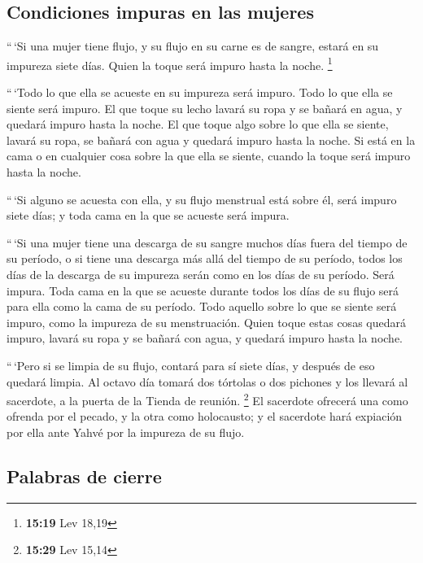 \begin{paracol}{2}
\hypertarget{condiciones-impuras-en-las-mujeres}{%
\subsection{Condiciones impuras en las
mujeres}\label{condiciones-impuras-en-las-mujeres}}

 ``\,`Si una mujer tiene flujo, y su flujo en su carne es
de sangre, estará en su impureza siete días. Quien la toque será impuro
hasta la noche. \footnote{\textbf{15:19} Lev 18,19}

 ``\,`Todo lo que ella se acueste en su impureza será
impuro. Todo lo que ella se siente será impuro.  El que
toque su lecho lavará su ropa y se bañará en agua, y quedará impuro
hasta la noche.  El que toque algo sobre lo que ella se
siente, lavará su ropa, se bañará con agua y quedará impuro hasta la
noche.  Si está en la cama o en cualquier cosa sobre la
que ella se siente, cuando la toque será impuro hasta la noche.

 ``\,`Si alguno se acuesta con ella, y su flujo menstrual
está sobre él, será impuro siete días; y toda cama en la que se acueste
será impura.

 ``\,`Si una mujer tiene una descarga de su sangre muchos
días fuera del tiempo de su período, o si tiene una descarga más allá
del tiempo de su período, todos los días de la descarga de su impureza
serán como en los días de su período. Será impura.  Toda
cama en la que se acueste durante todos los días de su flujo será para
ella como la cama de su período. Todo aquello sobre lo que se siente
será impuro, como la impureza de su menstruación.  Quien
toque estas cosas quedará impuro, lavará su ropa y se bañará con agua, y
quedará impuro hasta la noche.

 ``\,`Pero si se limpia de su flujo, contará para sí
siete días, y después de eso quedará limpia.  Al octavo
día tomará dos tórtolas o dos pichones y los llevará al sacerdote, a la
puerta de la Tienda de reunión. \footnote{\textbf{15:29} Lev 15,14}
 El sacerdote ofrecerá una como ofrenda por el pecado, y
la otra como holocausto; y el sacerdote hará expiación por ella ante
Yahvé por la impureza de su flujo.

\hypertarget{palabras-de-cierre}{%
\subsection{Palabras de cierre}\label{palabras-de-cierre}}


\end{paracol}
